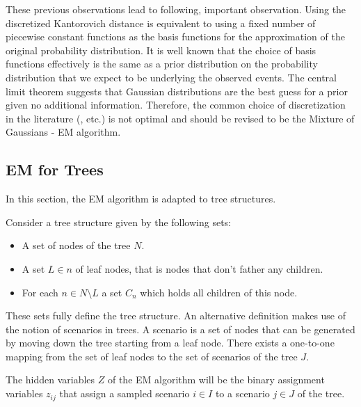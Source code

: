 These previous observations lead to following, important observation.
Using the discretized Kantorovich distance is equivalent to using a fixed number of piecewise constant functions as the basis functions for the approximation of the original probability distribution.
It is well known that the choice of basis functions effectively is the same as a prior distribution on the probability distribution that we expect to be underlying the observed events.
The central limit theorem suggests that Gaussian distributions are the best guess for a prior given no additional information.
Therefore, the common choice of discretization in the literature (\cite{Dupacova2003}, etc.) is not optimal and should be revised to be the Mixture of Gaussians - EM algorithm.

\subsection{EM for Trees}
\label{sec:mixt-gauss-trees}
In this section, the EM algorithm is adapted to tree structures. 

Consider a tree structure given by the following sets:
\begin{itemize}
\item A set of nodes of the tree $N$.
\item A set $L\in n$ of leaf nodes, that is nodes that don't father any children.
\item For each $n\in N\setminus L$ a set $C_n$ which holds all children of this node.
\end{itemize}
These sets fully define the tree structure.
An alternative definition makes use of the notion of scenarios in trees.
A scenario is a set of nodes that can be generated by moving down the tree starting from a leaf node.
There exists a one-to-one mapping from the set of leaf nodes to the set of scenarios of the tree $J$.

The hidden variables $Z$ of the EM algorithm will be the binary assignment variables $z_{ij}$ that
assign a sampled scenario $i\in I$ to a scenario $j\in J$ of the tree.

